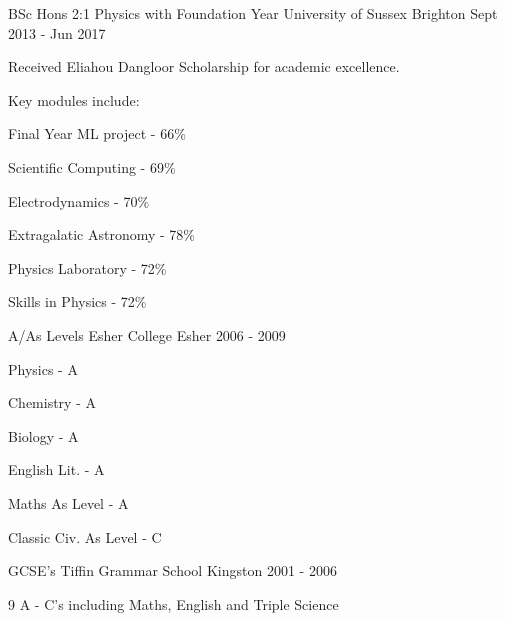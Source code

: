 \begin{cventries}
  \cventry
    {BSc Hons 2:1 Physics with Foundation Year}
    {University of Sussex}
    {Brighton}
    {Sept 2013 - Jun 2017}
    {
      \begin{cvitems}
      \item{Received Eliahou Dangloor Scholarship for academic excellence.}
      \item{Key modules include:}
      \setlength\multicolsep{0pt}
      \begin{multicols}{2}
        \item{Final Year ML project - 66\% }
        \item{Scientific Computing - 69\%}
        \item{Electrodynamics - 70\%}
        \item{Extragalatic Astronomy - 78\%}
        \item{Physics Laboratory - 72\%}
        \item{Skills in Physics - 72\%}
      \end{multicols}
      \end{cvitems}
    }
  \cventry
    {A/As Levels}
    {Esher College}
    {Esher}
    {2006 - 2009}
    { 
    \begin{cvitems}
    \setlength\multicolsep{0pt}
      \begin{multicols}{2}
      \item{Physics - A}
      \item{Chemistry - A}
      \item{Biology - A}
      \item{English Lit. - A}
      \item{Maths As Level - A}
      \item{Classic Civ. As Level - C}
      \end{multicols}
      \end{cvitems}
    }
  \cventry
    {GCSE's}
    {Tiffin Grammar School}
    {Kingston}
    {2001 - 2006}
    {
    \begin{cvitems}
      \item{9 A - C's including Maths, English and Triple Science}
      \end{cvitems}
    }
\end{cventries}
